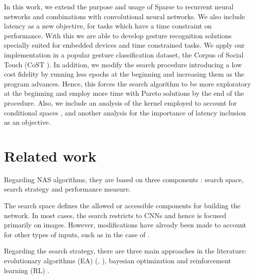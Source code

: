 \documentclass[a4paper, twocolumn]{article}
\begin{document}
In this work, we extend the purpose and usage of Sparse to recurrent neural networks and combinations with convolutional neural networks. We also include latency as a new objective, for tasks which have a time constraint on performance. With this we are able to develop gesture recognition solutions specially suited for embedded devices and time constrained tasks. We apply our implementation in a popular gesture classification dataset, the Corpus of Social Touch (CoST \cite{Jung2014}). In addition, we modify the search procedure introducing a low cost fidelity by running less epochs at the beginning and increasing them as the program advances. Hence, this forces the search algorithm to be more exploratory at the beginning and employ more time with Pareto solutions by the end of the procedure. Also, we include an analysis of the kernel employed to account for conditional spaces \cite{Swersky2014}, and another analysis for the importance of latency inclusion as an objective.

\section{Related work}

Regarding NAS algorithms, they are based on three components \cite{Elsken2019a}: search space, search strategy and performance  measure. 

The search space defines the allowed or accessible components for building the network. In most cases, the search restricts to CNNs and hence is focused primarily on images. However, modifications have already been made to account for other types of inputs, such as in the case of \cite{Wang2019a}.

Regarding the search strategy, there are three main approaches in the literature: evolutionary algorithms (EA) (\cite{Xie2017}, \cite{Stanley2002}), bayesian optimization \cite{Zhou2019a} and reinforcement learning (RL) \cite{Baker2016}. 

\end{document}
